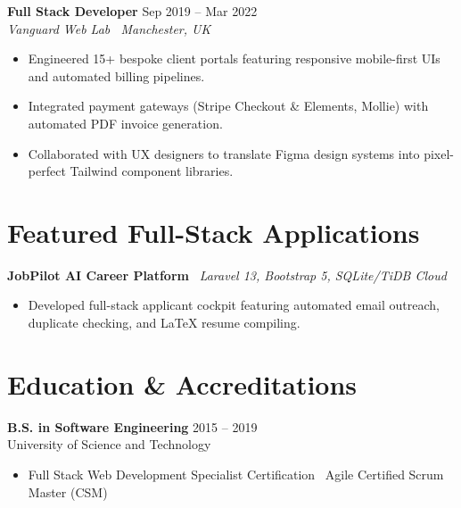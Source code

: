 \documentclass[10pt,a4paper]{article}
\begin{document}
\vspace{3pt}
\textbf{Full Stack Developer} \hfill Sep 2019 -- Mar 2022\\
\textit{Vanguard Web Lab \textbar\ Manchester, UK}
\begin{itemize}
    \item Engineered 15+ bespoke client portals featuring responsive mobile-first UIs and automated billing pipelines.
    \item Integrated payment gateways (Stripe Checkout \& Elements, Mollie) with automated PDF invoice generation.
    \item Collaborated with UX designers to translate Figma design systems into pixel-perfect Tailwind component libraries.
\end{itemize}

\section{Featured Full-Stack Applications}
\textbf{JobPilot AI Career Platform} \textbar\ \textit{Laravel 13, Bootstrap 5, SQLite/TiDB Cloud}
\begin{itemize}
    \item Developed full-stack applicant cockpit featuring automated email outreach, duplicate checking, and LaTeX resume compiling.
\end{itemize}

\section{Education \& Accreditations}
\textbf{B.S. in Software Engineering} \hfill 2015 -- 2019\\
University of Science and Technology
\begin{itemize}
    \item Full Stack Web Development Specialist Certification \textbar\ Agile Certified Scrum Master (CSM)
\end{itemize}
\end{document}
